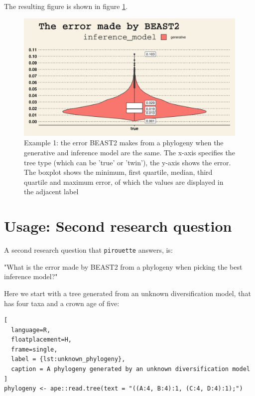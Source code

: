\documentclass{article}
\begin{document}
The resulting figure is shown in figure \ref{fig:example_1}.

\begin{figure}[h]
  \includegraphics[width=\textwidth]{figure_example_1.png}
  \caption{
    Example 1: the error BEAST2 makes from a phylogeny 
    when the generative and inference model are the same.
    The x-axis specifies the tree type (which can be 'true' or 'twin'), 
    the y-axis shows the error. 
    The boxplot shows the minimum, first quartile, median, third 
    quartile and maximum error, of which the values are displayed 
    in the adjacent label
  }
  \label{fig:example_1}
\end{figure}

\section{Usage: Second research question}

A second research question that \verb;pirouette; answers, is:

"What is the error made by BEAST2 from a phylogeny when
picking the best inference model?"

Here we start with a tree generated from an unknown 
diversification model, that has four taxa and a crown age of five:

\begin{lstlisting}[
  language=R, 
  floatplacement=H, 
  frame=single, 
  label = {lst:unknown_phylogeny},
  caption = A phylogeny generated by an unknown diversification model
]
phylogeny <- ape::read.tree(text = "((A:4, B:4):1, (C:4, D:4):1);")
\end{lstlisting}
\end{document}
